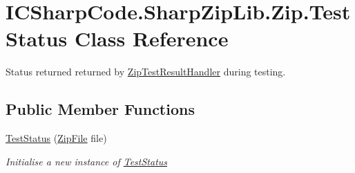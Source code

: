 \hypertarget{class_i_c_sharp_code_1_1_sharp_zip_lib_1_1_zip_1_1_test_status}{}\section{I\+C\+Sharp\+Code.\+Sharp\+Zip\+Lib.\+Zip.\+Test\+Status Class Reference}
\label{class_i_c_sharp_code_1_1_sharp_zip_lib_1_1_zip_1_1_test_status}


Status returned returned by \hyperlink{namespace_i_c_sharp_code_1_1_sharp_zip_lib_1_1_zip_a80ec37fb8220f68e710a9beff884a743}{Zip\+Test\+Result\+Handler} during testing.  


\subsection*{Public Member Functions}
\begin{DoxyCompactItemize}
\item 
\hyperlink{class_i_c_sharp_code_1_1_sharp_zip_lib_1_1_zip_1_1_test_status_a0e0dbade99e7914a64cfc580cbe87ba6}{Test\+Status} (\hyperlink{class_i_c_sharp_code_1_1_sharp_zip_lib_1_1_zip_1_1_zip_file}{Zip\+File} file)
\begin{DoxyCompactList}\small\item\em Initialise a new instance of \hyperlink{class_i_c_sharp_code_1_1_sharp_zip_lib_1_1_zip_1_1_test_status}{Test\+Status} \end{DoxyCompactList}\end{DoxyCompactItemize}
